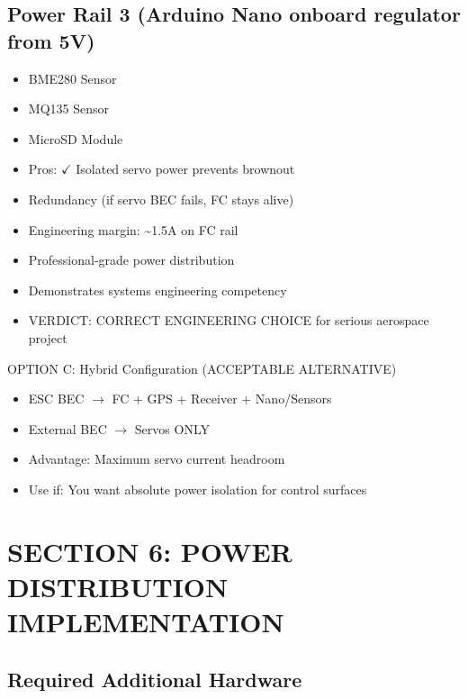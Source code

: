 \documentclass[11pt,letterpaper]{article}
\begin{document}
\subsection{Power Rail 3 (Arduino Nano onboard regulator from 5V)}

\begin{itemize}
  \item BME280 Sensor
  \item MQ135 Sensor
  \item MicroSD Module
\end{itemize}

\begin{itemize}
  \item Pros:  $\checkmark$ Isolated servo power prevents brownout
  \item Redundancy (if servo BEC fails, FC stays alive)
  \item Engineering margin: \textasciitilde{}1.5A on FC rail
  \item Professional-grade power distribution
  \item Demonstrates systems engineering competency
\end{itemize}

\begin{itemize}
  \item VERDICT: CORRECT ENGINEERING CHOICE for serious aerospace project
\end{itemize}

OPTION C: Hybrid Configuration (ACCEPTABLE ALTERNATIVE)\par

\begin{itemize}
  \item ESC BEC $\rightarrow$ FC + GPS + Receiver + Nano/Sensors
  \item External BEC $\rightarrow$ Servos ONLY
\end{itemize}

\begin{itemize}
  \item Advantage: Maximum servo current headroom
  \item Use if: You want absolute power isolation for control surfaces
\end{itemize}

\section{SECTION 6: POWER DISTRIBUTION IMPLEMENTATION}

\subsection{Required Additional Hardware}
\end{document}
